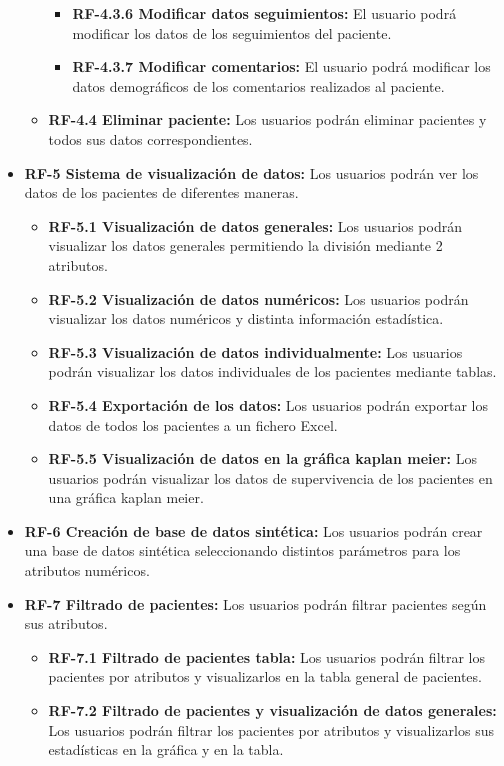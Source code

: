 \begin{itemize}
\begin{itemize}
\begin{itemize}
            \item \textbf{RF-4.3.6 Modificar datos seguimientos:} El usuario podrá modificar los datos de los seguimientos del paciente.
            \item \textbf{RF-4.3.7 Modificar comentarios:} El usuario podrá modificar los datos demográficos de los comentarios realizados al paciente.
        \end{itemize}
        \item \textbf{RF-4.4 Eliminar paciente:} Los usuarios podrán eliminar pacientes y todos sus datos correspondientes.
    \end{itemize}
	\item \textbf{RF-5 Sistema de visualización de datos:} Los usuarios podrán ver los datos de los pacientes de diferentes maneras.
	\begin{itemize}
	    \item \textbf{RF-5.1 Visualización de datos generales:} Los usuarios podrán visualizar los datos generales permitiendo la división mediante 2 atributos.
	    \item \textbf{RF-5.2 Visualización de datos numéricos:} Los usuarios podrán visualizar los datos numéricos y distinta información estadística.
	    \item \textbf{RF-5.3 Visualización de datos individualmente:}  Los usuarios podrán visualizar los datos individuales de los pacientes mediante tablas.
	    \item \textbf{RF-5.4 Exportación de los datos:} Los usuarios podrán exportar los datos de todos los pacientes a un fichero Excel.
	    \item \textbf{RF-5.5 Visualización de datos en la gráfica kaplan meier:} Los usuarios podrán visualizar los datos de supervivencia de los pacientes en una gráfica kaplan meier.
	\end{itemize}
	\item \textbf{RF-6 Creación de base de datos sintética:} Los usuarios podrán crear una base de datos sintética seleccionando distintos parámetros para los atributos numéricos.
    \item \textbf{RF-7 Filtrado de pacientes:} Los usuarios podrán filtrar pacientes según sus atributos.
	\begin{itemize}
	    \item \textbf{RF-7.1 Filtrado de pacientes tabla:} Los usuarios podrán filtrar los pacientes por atributos y visualizarlos en la tabla general de pacientes.
	    \item \textbf{RF-7.2 Filtrado de pacientes y visualización de datos generales:} Los usuarios podrán filtrar los pacientes por atributos y visualizarlos sus estadísticas en la gráfica y en la tabla.

\end{itemize}
\end{itemize}
